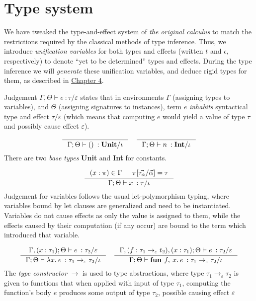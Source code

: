 \documentclass[declaration,shortabstract]{iithesis}
\theoremstyle{definition} \newtheorem{definition}{Definition}[section]
\newcommand{\types}[4][\Gamma;\Theta]{\ensuremath{{{#1} \vdash {#2} \: : {#3}/{#4}}}}
\newcommand{\arrow}[3]{{#1}\rightarrow_{#2}{#3}}
\newcommand{\lam}[1][x]{\ensuremath{\lambda #1.\:}}
\newcommand{\fun}[1][f,\:x]{\ensuremath{\textbf{fun } #1.\:}}
\begin{document}
\chapter{Type system}
We have tweaked the type-and-effect system of \textit{the original calculus}
to match the restrictions required by the classical methods of type inference.
Thus, we introduce \textit{unification variables} for both types and effects
(written $t$ and $\epsilon$, respectively) to denote ``yet to be determined'' types and effects.
During the type inference we will \textit{generate} these unification variables,
and deduce rigid types for them, as described in \hyperlink{chapter.4}{Chapter 4}.

Judgement $\types[\Gamma, \Theta]{e}{\tau}{\varepsilon}$ states that in environments $\Gamma$ (assigning types to variables),
and $\Theta$ (assigning signatures to instances), term $e$ \textit{inhabits} syntactical type and effect $\tau / \varepsilon$ (which means that computing $e$ would yield a value of type $\tau$ and possibly cause effect $\varepsilon$).

$$
\inference{}{\types{()}{\textbf{Unit}}{\iota}}
\quad
\inference{}{\types{n}{\textbf{Int}}{\iota}}{}
$$
\setlength{\jot}{10pt}
There are two \textit{base types} \textbf{Unit} and \textbf{Int} for constants.

$$
\inference{(x : \pi) \in \Gamma & \pi[\vec{\tau_\alpha} / \vec{\alpha}] = \tau}{\types{x}{\tau}{\iota}}
$$
Judgement for variables follows the usual let-polymorphism typing, 
where variables bound by let clauses are generalized and need to be instantiated.
Variables do not cause effects as only the value is assigned to them,
while the effects caused by their computation (if any occur)
are bound to the term which introduced that variable.

$$
\inference{
    \types[\Gamma,(x : \tau_1); \Theta]{e}{\tau_2}{\varepsilon} 
}{
    \types{\lam e}{\arrow{\tau_1}{\varepsilon}{\tau_2}}{\iota}
}
\quad
\inference{
    \types[\Gamma, (f : \arrow{\tau_1}{\varepsilon}{t_2}),(x : \tau_1); \Theta]{e}{\tau_2}{\varepsilon} 
}{
    \types{\fun e}{\arrow{\tau_1}{\varepsilon}{\tau_2}}{\iota}
}
$$
The \textit{type constructor} $\rightarrow$ is used to type abstractions,
where type $\arrow{\tau_1}{\varepsilon}{\tau_2}$ is given to functions
that when applied with input of type $\tau_1$, computing the function's body $e$ produces some output of type $\tau_2$, possible causing effect $\varepsilon$
\end{document}
